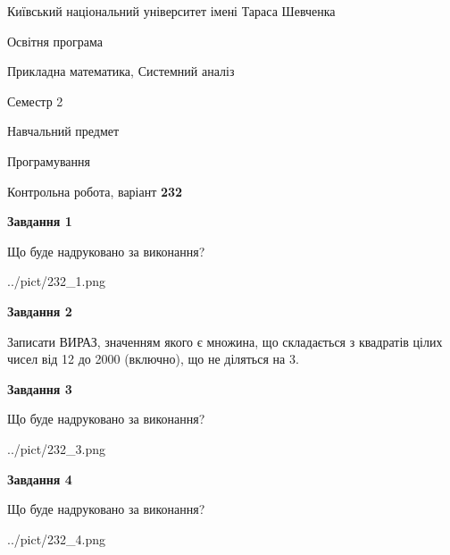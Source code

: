 \documentclass[12pt, ukrainian]{article}
\begin{document}
{{\begin {small}\par
{ \center  Київський національний університет імені Тараса Шевченка \par}
{\parbox {5 cm}{Освітня програма \hfill}{\parbox {8 cm}{Прикладна математика, Системний аналіз \hfill}}\parbox {5 cm}{\hfill Семестр 2}}\par
{\parbox {5 cm} {Навчальний предмет \hfill}\parbox {7 cm}{Програмування \hfill}\parbox {6cm}{\hfill}\par}\vspace{-7pt} \end{small}}{\center Контрольна робота, варіант  \No \textbf
{ 232 }\par}}
{
\begin {large}
{\begin {center}\textbf{Завдання 1}\end {center}}\par
Що буде надруковано за виконання?\par\par
\begin{center}
	{../pict/232_1.png}
\end{center}
\newpage

{\begin {center}\textbf{Завдання 2}\end {center}}\par
Записати ВИРАЗ, значенням якого є множина, що складається з квадратів цілих чисел від 12 до 2000 (включно), що не діляться на 3.\par
\newpage

{\begin {center}\textbf{Завдання 3}\end {center}}\par
Що буде надруковано за виконання?
\begin{center}
	{../pict/232_3.png}
\end{center}
\newpage

{\begin {center}\textbf{Завдання 4}\end {center}}\par
Що буде надруковано за виконання?\par
\begin{center}
	{../pict/232_4.png}
\end{center}
\newpage


\end{large}}
\end{document}
